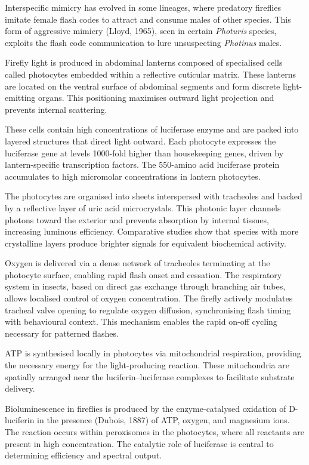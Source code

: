 Interspecific mimicry has evolved in some lineages, where predatory fireflies imitate female flash codes to attract and consume males of other species. This form of aggressive mimicry (Lloyd, 1965), seen in certain \emph{Photuris} species, exploits the flash code communication to lure unsuspecting \emph{Photinus} males.

Firefly light is produced in abdominal lanterns composed of specialised cells called photocytes embedded within a reflective cuticular matrix. These lanterns are located on the ventral surface of abdominal segments and form discrete light-emitting organs. This positioning maximises outward light projection and prevents internal scattering.

These cells contain high concentrations of luciferase enzyme and are packed into layered structures that direct light outward. Each photocyte expresses the luciferase gene at levels 1000-fold higher than housekeeping genes, driven by lantern-specific transcription factors. The 550-amino acid luciferase protein accumulates to high micromolar concentrations in lantern photocytes. 

The photocytes are organised into sheets interspersed with tracheoles and backed by a reflective layer of uric acid microcrystals. This photonic layer channels photons toward the exterior and prevents absorption by internal tissues, increasing luminous efficiency. Comparative studies show that species with more crystalline layers produce brighter signals for equivalent biochemical activity.

Oxygen is delivered via a dense network of tracheoles terminating at the photocyte surface, enabling rapid flash onset and cessation. The respiratory system in insects, based on direct gas exchange through branching air tubes, allows localised control of oxygen concentration. The firefly actively modulates tracheal valve opening to regulate oxygen diffusion, synchronising flash timing with behavioural context. This mechanism enables the rapid on-off cycling necessary for patterned flashes.

ATP is synthesised locally in photocytes via mitochondrial respiration, providing the necessary energy for the light-producing reaction. These mitochondria are spatially arranged near the luciferin–luciferase complexes to facilitate substrate delivery.

Bioluminescence in fireflies is produced by the enzyme-catalysed oxidation of D-luciferin in the presence (Dubois, 1887) of ATP, oxygen, and magnesium ions. The reaction occurs within peroxisomes in the photocytes, where all reactants are present in high concentration. The catalytic role of luciferase is central to determining efficiency and spectral output.

